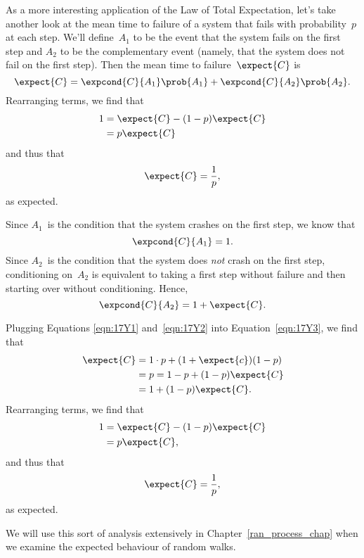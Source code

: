 As a more interesting application of the Law of Total Expectation,
let's take another look at the mean time to failure of a system that
fails with probability~$p$ at each step.  We'll define~$A_1$ to be the
event that the system fails on the first step and $A_2$ to be the
complementary event (namely, that the system does not fail on the
first step).  Then the mean time to failure~$\expect{C}$ is
\begin{equation}\label{eqn:17Y3}
    \expect{C} = \expcond{C}{A_1} \prob{A_1} + \expcond{C}{A_2} \prob{A_2}.
\end{equation}
Rearranging terms, we find that
\begin{align*}
    1 &= \expect{C} - (1 - p) \expect{C} \\
      &= p \expect{C}
\end{align*}
and thus that
\begin{equation*}
    \expect{C} = \frac{1}{p},
\end{equation*}
as expected.

Since $A_1$~is the condition that the system crashes on the first
step, we know that
\begin{equation}\label{eqn:17Y1}
    \expcond{C}{A_1} = 1.
\end{equation}
Since $A_2$~is the condition that the system does \emph{not} crash on
the first step, conditioning on~$A_2$ is equivalent to taking a first
step without failure and then starting over without conditioning.
Hence,
\begin{equation}\label{eqn:17Y2}
    \expcond{C}{A_2} = 1 + \expect{C}.
\end{equation}

Plugging Equations \ref{eqn:17Y1} and~\ref{eqn:17Y2} into
Equation~\ref{eqn:17Y3}, we find that
\begin{align*}
\expect{C}
    &= 1 \cdot p + (1 + \expect{c}) (1 - p) \\
    &= p = 1 - p + (1 - p) \expect{C} \\
    &= 1 + (1 - p) \expect{C}.
\end{align*}
Rearranging terms, we find that
\begin{align*}
    1   &= \expect{C} - (1 - p) \expect{C} \\
        &= p \expect{C},
\end{align*}
and thus that
\begin{equation*}
    \expect{C} = \frac{1}{p},
\end{equation*}
as expected.

We will use this sort of analysis extensively in
Chapter~\ref{ran_process_chap} when we examine the expected behaviour
of random walks.

